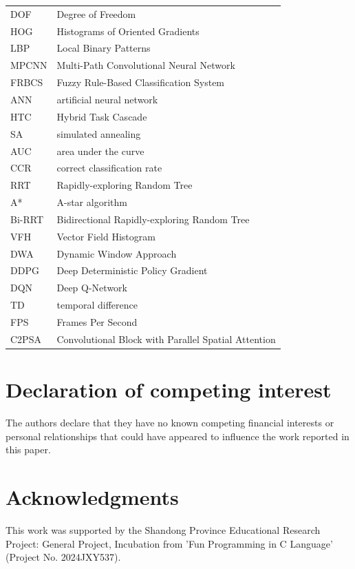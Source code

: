 \documentclass[a4paper,fleqn]{cas-dc}
\begin{document}
{\begin{tabular}{@{}p{2cm}p{5cm}}
  DOF & Degree of Freedom \\
  HOG & Histograms of Oriented Gradients \\
  LBP & Local Binary Patterns \\
  MPCNN & Multi-Path Convolutional Neural Network \\
  FRBCS & Fuzzy Rule-Based Classification System \\
  ANN & artificial neural network \\
  HTC	    & Hybrid Task Cascade \\
  SA & simulated annealing \\
  AUC		& area under the curve \\
  CCR & correct classification rate \\
  RRT & Rapidly-exploring Random Tree \\
  A*	  & A-star algorithm	\\
  Bi-RRT & Bidirectional Rapidly-exploring Random Tree \\
  VFH & Vector Field Histogram \\
  DWA & Dynamic Window Approach \\
  DDPG & Deep Deterministic Policy Gradient \\
  DQN & Deep Q-Network \\
  TD & temporal difference \\
  FPS & Frames Per Second \\
  C2PSA	& Convolutional Block with Parallel Spatial Attention \\

\bottomrule
	\end{tabular}
}
\section*{Declaration of competing interest}
The authors declare that they have no known competing financial
interests or personal relationships that could have appeared
to influence the work reported in this paper.
\section{Acknowledgments}  
This work was supported by the Shandong Province Educational Research Project: General Project, Incubation from 'Fun Programming in C Language' (Project No. 2024JXY537). 

\clearpage
{} %
%
 	
% 
%  				


\vskip6pt
\end{document}
